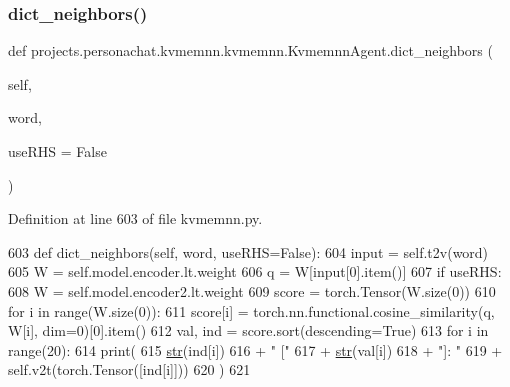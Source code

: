 \subsubsection{\texorpdfstring{dict\+\_\+neighbors()}{dict\_neighbors()}}
{\footnotesize\ttfamily def projects.\+personachat.\+kvmemnn.\+kvmemnn.\+Kvmemnn\+Agent.\+dict\+\_\+neighbors (\begin{DoxyParamCaption}\item[{}]{self,  }\item[{}]{word,  }\item[{}]{use\+R\+HS = {\ttfamily False} }\end{DoxyParamCaption})}



Definition at line 603 of file kvmemnn.\+py.


\begin{DoxyCode}
603     \textcolor{keyword}{def }dict\_neighbors(self, word, useRHS=False):
604         input = self.t2v(word)
605         W = self.model.encoder.lt.weight
606         q = W[input[0].item()]
607         \textcolor{keywordflow}{if} useRHS:
608             W = self.model.encoder2.lt.weight
609         score = torch.Tensor(W.size(0))
610         \textcolor{keywordflow}{for} i \textcolor{keywordflow}{in} range(W.size(0)):
611             score[i] = torch.nn.functional.cosine\_similarity(q, W[i], dim=0)[0].item()
612         val, ind = score.sort(descending=\textcolor{keyword}{True})
613         \textcolor{keywordflow}{for} i \textcolor{keywordflow}{in} range(20):
614             print(
615                 \hyperlink{namespacegenerate__task__READMEs_a5b88452ffb87b78c8c85ececebafc09f}{str}(ind[i])
616                 + \textcolor{stringliteral}{" ["}
617                 + \hyperlink{namespacegenerate__task__READMEs_a5b88452ffb87b78c8c85ececebafc09f}{str}(val[i])
618                 + \textcolor{stringliteral}{"]: "}
619                 + self.v2t(torch.Tensor([ind[i]]))
620             )
621 
\end{DoxyCode}
\mbox{\label{classprojects_1_1personachat_1_1kvmemnn_1_1kvmemnn_1_1KvmemnnAgent_a5b97a313aca270ad38c6ff48b1e9695a}} 
